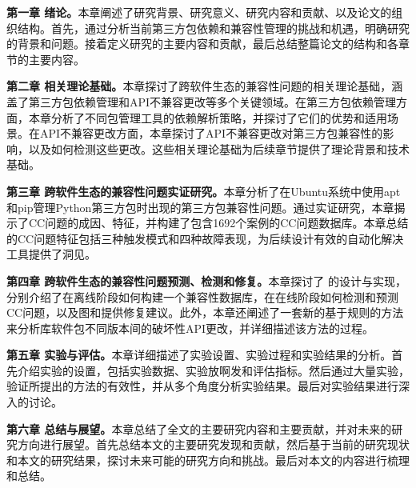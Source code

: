 \textbf{第一章 绪论。}本章阐述了研究背景、研究意义、研究内容和贡献、以及论文的组织结构。首先，通过分析当前第三方包依赖和兼容性管理的挑战和机遇，明确研究的背景和问题。接着定义研究的主要内容和贡献，最后总结整篇论文的结构和各章节的主要内容。

\textbf{第二章 相关理论基础。}本章探讨了跨软件生态的兼容性问题的相关理论基础，涵盖了第三方包依赖管理和API不兼容更改等多个关键领域。在第三方包依赖管理方面，本章分析了不同包管理工具的依赖解析策略，并探讨了它们的优势和适用场景。在API不兼容更改方面，本章探讨了API不兼容更改对第三方包兼容性的影响，以及如何检测这些更改。这些相关理论基础为后续章节提供了理论背景和技术基础。

\textbf{第三章 跨软件生态的兼容性问题实证研究。}本章分析了在Ubuntu系统中使用apt和pip管理Python第三方包时出现的第三方包兼容性问题。通过实证研究，本章揭示了CC问题的成因、特征，并构建了包含1692个案例的CC问题数据库。本章总结的CC问题特征包括三种触发模式和四种故障表现，为后续设计有效的自动化解决工具提供了洞见。

\textbf{第四章 跨软件生态的兼容性问题预测、检测和修复。}本章探讨了 \tool{}的设计与实现，分别介绍了\tool{}在离线阶段如何构建一个兼容性数据库，在在线阶段如何检测和预测CC问题，以及图和提供修复建议。此外，本章还阐述了一套新的基于规则的方法来分析库软件包不同版本间的破坏性API更改，并详细描述该方法的过程。


\textbf{第五章 实验与评估。}本章详细描述了实验设置、实验过程和实验结果的分析。首先介绍实验的设置，包括实验数据、实验放啊发和评估指标。然后通过大量实验，验证所提出的方法的有效性，并从多个角度分析实验结果。最后对实验结果进行深入的讨论。

\textbf{第六章 总结与展望。}本章总结了全文的主要研究内容和主要贡献，并对未来的研究方向进行展望。首先总结本文的主要研究发现和贡献，然后基于当前的研究现状和本文的研究结果，探讨未来可能的研究方向和挑战。最后对本文的内容进行梳理和总结。


